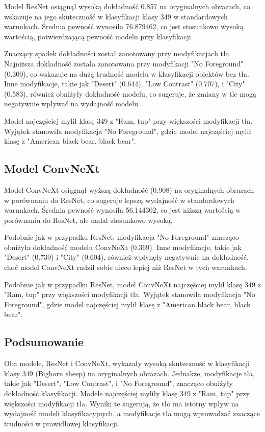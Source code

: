 Model ResNet osiągnął wysoką dokładność 0.857 na oryginalnych obrazach, co wskazuje na jego skuteczność w klasyfikacji klasy 349 w standardowych warunkach. Średnia pewność wynosiła 76.879462, co jest stosunkowo wysoką wartością, potwierdzającą pewność modelu przy klasyfikacji.

Znaczący spadek dokładności został zanotowany przy modyfikacjach tła. Najniższa dokładność została zanotowana przy modyfikacji "No Foreground" (0.300), co wskazuje na dużą trudność modelu w klasyfikacji obiektów bez tła. Inne modyfikacje, takie jak "Desert" (0.644), "Low Contrast" (0.707), i "City" (0.583), również obniżyły dokładność modelu, co sugeruje, że zmiany w tle mogą negatywnie wpływać na wydajność modelu.

Model najczęściej mylił klasę 349 z "Ram, tup" przy większości modyfikacji tła. Wyjątek stanowiła modyfikacja "No Foreground", gdzie model najczęściej mylił klasę z "American black bear, black bear".

\subsection*{Model ConvNeXt}

Model ConvNeXt osiągnął wyższą dokładność (0.908) na oryginalnych obrazach w porównaniu do ResNet, co sugeruje lepszą wydajność w standardowych warunkach. Średnia pewność wynosiła 56.144302, co jest niższą wartością w porównaniu do ResNet, ale nadal stosunkowo wysoką.

Podobnie jak w przypadku ResNet, modyfikacja "No Foreground" znacząco obniżyła dokładność modelu ConvNeXt (0.369). Inne modyfikacje, takie jak "Desert" (0.739) i "City" (0.604), również wpłynęły negatywnie na dokładność, choć model ConvNeXt radził sobie nieco lepiej niż ResNet w tych warunkach.

Podobnie jak w przypadku ResNet, model ConvNeXt najczęściej mylił klasę 349 z "Ram, tup" przy większości modyfikacji tła. Wyjątek stanowiła modyfikacja "No Foreground", gdzie model najczęściej mylił klasę z "American black bear, black bear".

\subsection*{Podsumowanie}

Oba modele, ResNet i ConvNeXt, wykazały wysoką skuteczność w klasyfikacji klasy 349 (Bighorn sheep) na oryginalnych obrazach. Jednakże, modyfikacje tła, takie jak "Desert", "Low Contrast", i "No Foreground", znacząco obniżyły dokładność klasyfikacji. Modele najczęściej myliły klasę 349 z "Ram, tup" przy większości modyfikacji tła. Wyniki te sugerują, że tło ma istotny wpływ na wydajność modeli klasyfikacyjnych, a modyfikacje tła mogą wprowadzać znaczące trudności w prawidłowej klasyfikacji.


